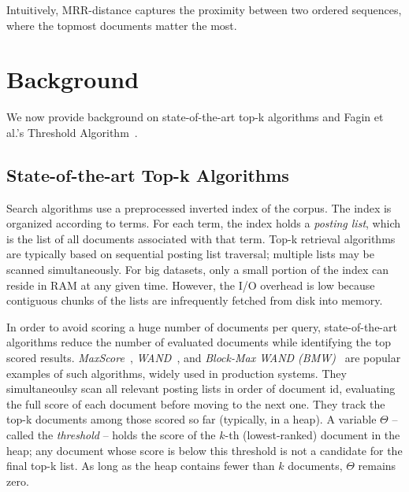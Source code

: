 \noindent
Intuitively, MRR-distance captures the proximity between two ordered sequences, %
where the topmost documents matter the most.  


\section{Background}
\label{sec:background}

We now provide background on  state-of-the-art top-k algorithms and Fagin et al.'s Threshold Algorithm~\cite{Fagin:2003}.

\subsection{State-of-the-art Top-k Algorithms}

Search algorithms use a preprocessed inverted index of the corpus. The index is organized according to terms. For each term, the index holds a \emph{posting list}, which is the list of all documents associated with that term. Top-k retrieval algorithms are typically based on sequential posting list traversal; multiple lists may be scanned simultaneously. For big datasets, only a small portion of the index can reside in RAM at any given time. However, the I/O overhead is low because 
contiguous chunks of the lists are infrequently fetched from disk into memory.

In order to avoid scoring a huge number of documents per query, state-of-the-art algorithms reduce the number of evaluated documents while identifying the top scored results. 
{\em MaxScore}~\cite{Strohman:2005,Turtle:1995}, {\em WAND}~\cite{Broder:2003}, and {\em Block-Max WAND (BMW)}~\cite{Ding:2011} are popular examples of such algorithms, widely used in production systems. 
They  simultaneoulsy scan all relevant posting lists in order of document id, evaluating the full score of each document before moving to the next one. They track the top-k documents among those scored so far (typically, in a heap). A variable $\Theta$ -- called the \emph{threshold} -- holds the score of the $k$-th (lowest-ranked) document in the heap;  any document whose  score is below this threshold is not a candidate for the final top-k list. As long as the heap contains fewer than $k$ documents, $\Theta$ remains zero.

